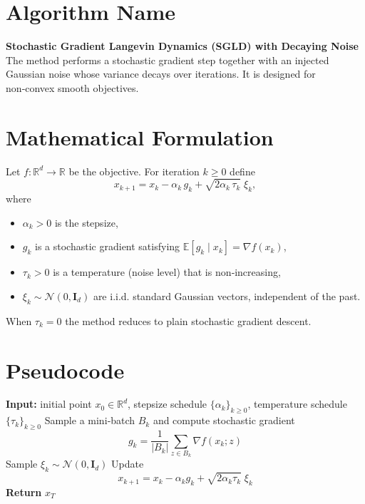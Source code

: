 \documentclass{article}
\newcommand{\E}{\mathbb{E}}
\newcommand{\R}{\mathbb{R}}
\begin{document}
\section*{Algorithm Name}
\textbf{Stochastic Gradient Langevin Dynamics (SGLD) with Decaying Noise}\\
The method performs a stochastic gradient step together with an injected Gaussian noise whose variance decays over iterations. It is designed for non‑convex smooth objectives.

\section*{Mathematical Formulation}
Let $f:\R^{d}\rightarrow\R$ be the objective. For iteration $k\ge 0$ define
\[
\boxed{
x_{k+1}=x_{k}-\alpha_{k}\,g_{k}+ \sqrt{2\alpha_{k}\,\tau_{k}}\;\xi_{k}},
\tag{1}
\]
where
\begin{itemize}[nosep]
\item $\alpha_{k}>0$ is the stepsize,
\item $g_{k}$ is a stochastic gradient satisfying $\E[g_{k}\mid x_{k}]=\nabla f(x_{k})$,
\item $\tau_{k}>0$ is a temperature (noise level) that is non‑increasing,
\item $\xi_{k}\sim\mathcal N(0,\mathbf I_{d})$ are i.i.d. standard Gaussian vectors, independent of the past.
\end{itemize}
When $\tau_{k}=0$ the method reduces to plain stochastic gradient descent.

\section*{Pseudocode}
\begin{algorithm}[H]
\caption{SGLD with Decaying Noise}
\begin{algorithmic}[1]
\State \textbf{Input:} initial point $x_{0}\in\R^{d}$, stepsize schedule $\{\alpha_{k}\}_{k\ge0}$, temperature schedule $\{\tau_{k}\}_{k\ge0}$
    \State Sample a mini‑batch $B_{k}$ and compute stochastic gradient 
    \[
    g_{k}= \frac{1}{|B_{k}|}\sum_{z\in B_{k}}\nabla f(x_{k};z)
    \]
    \State Sample $\xi_{k}\sim\mathcal N(0,\mathbf I_{d})$
    \State Update 
    \[
    x_{k+1}=x_{k}-\alpha_{k} g_{k}+ \sqrt{2\alpha_{k}\tau_{k}}\;\xi_{k}
    \]
\EndFor
\State \textbf{Return} $x_{T}$
\end{algorithmic}
\end{algorithm}
\end{document}
